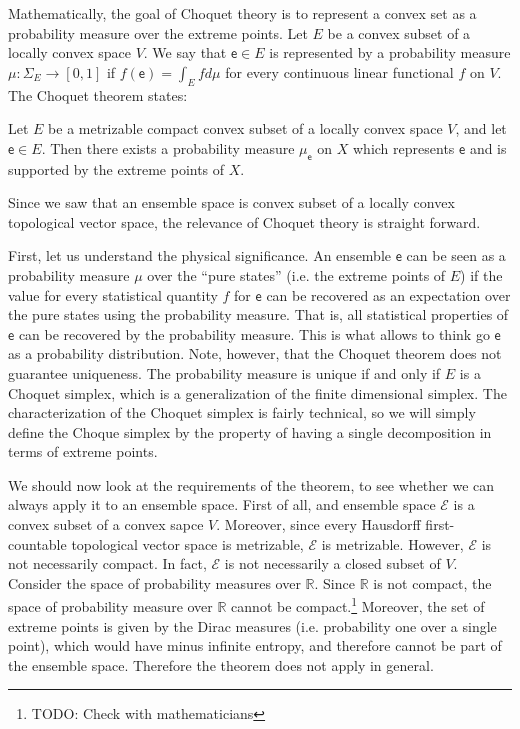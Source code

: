 \documentclass[10pt,twocolumn, nofootinbib]{revtex4-2}
\newcommand{\ens}[1][e] {\mathsf{#1}} %
\newcommand{\Ens}[1][E] {\mathcal{#1}} %
\begin{document}
Mathematically, the goal of Choquet theory is to represent a convex set as a probability measure over the extreme points. Let $E$ be a convex subset of a locally convex space $V$. We say that $\ens \in E$ is represented by a probability measure $\mu : \Sigma_{E} \to [0,1]$ if $f(\ens) = \int_E f d\mu$ for every continuous linear functional $f$ on $V$. The Choquet theorem states:
\begin{thrm}[Choquet]
	Let $E$ be a metrizable compact convex subset of a locally convex space $V$, and let $\ens \in E$. Then there exists a probability measure $\mu_{\ens}$ on $X$ which represents $\ens$ and is supported by the extreme points of $X$.
\end{thrm}
Since we saw that an ensemble space is convex subset of a locally convex topological vector space, the relevance of Choquet theory is straight forward.



First, let us understand the physical significance. An ensemble $\ens$ can be seen as a probability measure $\mu$ over the ``pure states'' (i.e. the extreme points of $E$) if the value for every statistical quantity $f$ for $\ens$ can be recovered as an expectation over the pure states using the probability measure. That is, all statistical properties of $\ens$ can be recovered by the probability measure. This is what allows to think go $\ens$ as a probability distribution. Note, however, that the Choquet theorem does not guarantee uniqueness. The probability measure is unique if and only if $E$ is a Choquet simplex, which is a generalization of the finite dimensional simplex. The characterization of the Choquet simplex is fairly technical, so we will simply define the Choque simplex by the property of having a single decomposition in terms of extreme points.


We should now look at the requirements of the theorem, to see whether we can always apply it to an ensemble space. First of all, and ensemble space $\Ens$ is a convex subset of a convex sapce $V$. Moreover, since every Hausdorff first-countable topological vector space is metrizable, $\Ens$ is metrizable. However, $\Ens$ is not necessarily compact. In fact, $\Ens$ is not necessarily a closed subset of $V$. Consider the space of probability measures over $\mathbb{R}$. Since $\mathbb{R}$ is not compact, the space of probability measure over $\mathbb{R}$ cannot be compact.\footnote{TODO: Check with mathematicians} Moreover, the set of extreme points is given by the Dirac measures (i.e. probability one over a single point), which would have minus infinite entropy, and therefore cannot be part of the ensemble space. Therefore the theorem does not apply in general.
\end{document}
